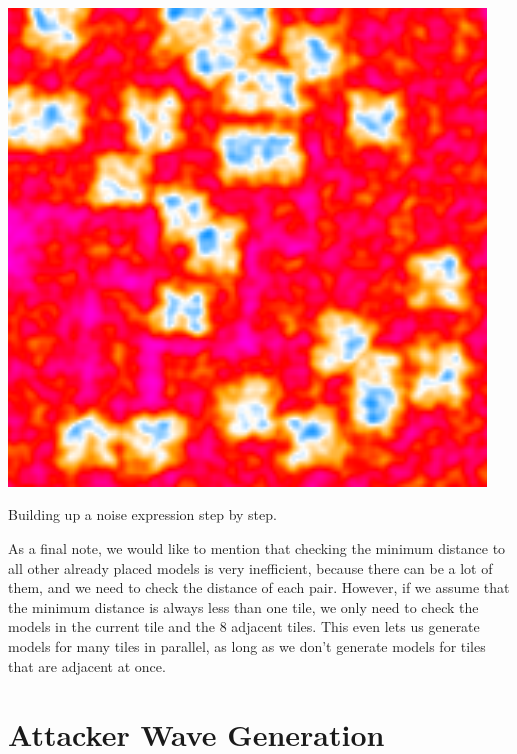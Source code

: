 \begin{center}
\begin{minipage}{.31\textwidth}
        \small{}
    \end{minipage}%
    \begin{minipage}{.31\textwidth}
        \centering
        \includegraphics[width=0.95\textwidth]{img/noise expr step3.png}
        \small{}
    \end{minipage}
    \caption{Building up a noise expression step by step.}
    \label{fig:noise-expr-steps}
\end{center}

As a final note, we would like to mention that checking the minimum distance to all other already placed models is very inefficient, because there can be a lot of them, and we need to check the distance of each pair.
However, if we assume that the minimum distance is always less than one tile, we only need to check the models in the current tile and the 8 adjacent tiles.
This even lets us generate models for many tiles in parallel, as long as we don't generate models for tiles that are adjacent at once.

\section{Attacker Wave Generation}\label{sec:analysis-waves}

